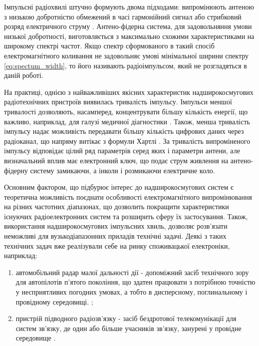 Імпульсні радіохвилі штучно формують двома підходами: випромінюють антеною 
з низькою добротністю обмежений в часі гармонійний сигнал 
\cite{imp:Mesyas1963, imp:Mesyas1974} або стрибковий розряд електричного 
струму \cite{imp:BaumMN053}. Антено-фідерна система, для задовольняння 
умови низької добротності, виготовляється з максимально схожими 
характеристиками на широкому спектрі частот. Якщо спектр сформованого в 
такий спосіб електромагнітного коливання не задовольняє умові 
мінімальної ширини спектру \eqref{eq:spectum_width}, то його називають 
радіоімпульсом, який не розгладяться в даній роботі.

На практиці, однією з найважливіших якісних характеристик надширокосмугових
радіотехнічних пристроїв виявилась тривалість імпульсу. Імпульси меншої 
тривалості дозволяють, насамперед, концентрувати більшу кількість енергії,
що важливо, наприклад, для галузі медичної діагностики 
\cite{imp:Guardiola2010}. Також, менша тривалість імпульсу надає 
можливість передавати більшу кількість цифрових даних через радіоканал, що 
напряму витікає з формули Хартлі \cite{imp:Taub1986}. За тривалість 
випроміненого імпульсу відповідає цілий ряд параметрів серед яких і 
параметри антени, але визначальний вплив має електронний ключ, що подає 
струм живлення на антено-фідерну систему замикаючи, а інколи і розмикаючи 
електричне коло.


Основним фактором, що підбурює інтерес до надширокосмугових систем є 
теоретична можливість поєднати особливості електромагнітного випромінювання 
на різних частотних діапазонах, що дозволить покращити характеристики 
існуючих радіоелектронних систем та розширить сферу їх застосування. 
Також, використання надширокосмугових імпульсних хвиль, дозволяє
розв'язати неможливі для вузькодіапазонних приладів технічні задачі. 
Деякі з таких технічних задач вже реалізували себе на ринку споживацької 
електроніки, наприклад:

\begin{enumerate}
\item автомобільний радар малої дальності дії - допоміжний засіб 
технічного зору для автопілотів п'ятого покоління, що здатен працювати 
з потрібною точністю у несприятливих погодних умовах, а тобто в 
дисперсному, поглинальному і провідному середовищі.
\cite{imp:Yarovoy2017};
\item пристрій підводного радіозв'язку - засіб бездротової 
телекомунікації для систем зв'язку, де один або більше учасників 
зв'язку, занурені у провідне середовище \cite{imp:Garcia2009, 
imp:Karagianni2015}.
\end{enumerate}

